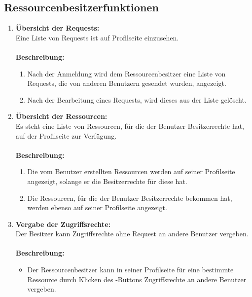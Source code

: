 \documentclass[parskip=full,11pt]{scrartcl}
\def\threedigits#1{%
  \ifnum#1<10 0\fi
  \ifnum#1<1 0\fi
  \number#1}
\begin{document}
\subsection{Ressourcenbesitzerfunktionen}
\begin{enumerate}[label={\textbf{/F\protect\threedigits{\theenumi}0/}}, leftmargin=*, resume]
\item \label{FARB1} \textbf{Übersicht der Requests:}\\
Eine Liste von Requests ist auf Profilseite einzusehen.\\\\
\textbf{Beschreibung:}\\
\begin{enumerate}[label=(\arabic*), leftmargin=*]
\item Nach der Anmeldung wird dem Ressourcenbesitzer eine Liste von Requests, die von anderen Benutzern gesendet wurden, angezeigt.
\item Nach der Bearbeitung eines Requests, wird dieses aus der Liste gelöscht.  
\end{enumerate}

\item \label{FARB2} \textbf{Übersicht der Ressourcen:}\\
Es steht eine Liste von Ressourcen, für die der Benutzer Besitzerrechte hat,  auf der Profilseite zur Verfügung.\\\\
\textbf{Beschreibung:}\\
\begin{enumerate}[label=(\arabic*), leftmargin=*]
\item Die vom Benutzer erstellten Ressourcen werden auf seiner Profilseite angezeigt, solange er die Besitzerrechte für diese hat.
\item Die Ressourcen, für die der Benutzer Besitzerrechte bekommen hat, werden ebenso auf seiner Profilseite angezeigt.  
\end{enumerate}


\item \label{FARB3} \textbf {Vergabe der Zugriffsrechte:}\\ 
Der Besitzer kann Zugriffsrechte ohne Request an andere Benutzer vergeben.\\\\
\textbf{Beschreibung:}\\
\begin{itemize}[itemsep=0pt, leftmargin=*]
\item Der Ressourcenbesitzer kann in seiner Profilseite für eine bestimmte Ressource durch Klicken des \grqq -Buttons Zugriffsrechte an andere Benutzer vergeben.
\end{itemize}
\newpage


\end{enumerate}
\end{document}
